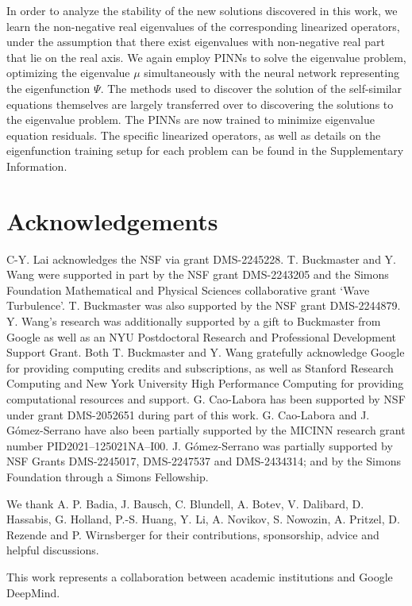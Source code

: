 \documentclass[fleqn,11pt]{wlscirep}
\begin{document}
In order to analyze the stability of the new solutions discovered in this work, we learn the non-negative real eigenvalues of the corresponding linearized operators, under the assumption that there exist eigenvalues with non-negative real part that lie on the real axis. We again employ PINNs to solve the eigenvalue problem, optimizing the eigenvalue $\mu$ simultaneously with the neural network representing the eigenfunction $\Psi$. The methods used to discover the solution of the self-similar equations themselves are largely transferred over to discovering the solutions to the eigenvalue problem. The PINNs are now trained to minimize eigenvalue equation residuals. The specific linearized operators, as well as details on the eigenfunction training setup for each problem can be found in the Supplementary Information.

\section*{Acknowledgements}

C-Y. Lai acknowledges the NSF  via grant  DMS-2245228. T. Buckmaster and Y. Wang were supported in part by the NSF grant DMS-2243205 and the Simons Foundation Mathematical and Physical Sciences collaborative grant `Wave Turbulence'. T. Buckmaster was also supported by the NSF grant DMS-2244879. Y. Wang's research was additionally supported by a gift to Buckmaster from Google as well as an NYU Postdoctoral Research and Professional Development Support Grant. Both T. Buckmaster and Y. Wang  gratefully acknowledge Google for providing computing credits and subscriptions, as well as   Stanford Research Computing and New York University High Performance Computing
for providing computational resources and support. G. Cao-Labora has been supported by NSF under grant DMS-2052651 during part of this work. G. Cao-Labora and J. G\'omez-Serrano have also been partially supported by the MICINN research grant number PID2021–125021NA–I00. J. G\'omez-Serrano was partially supported by NSF Grants DMS-2245017, DMS-2247537 and DMS-2434314; and by the Simons Foundation through a Simons Fellowship.

We thank A. P. Badia, J. Bausch,  C. Blundell, A. Botev, V. Dalibard, D. Hassabis, G. Holland, P.-S. Huang, Y. Li, A. Novikov, S. Nowozin, A. Pritzel, D. Rezende and P. Wirnsberger for their contributions, sponsorship, advice and helpful discussions. 

This work represents a collaboration between academic institutions and Google DeepMind.
\end{document}
